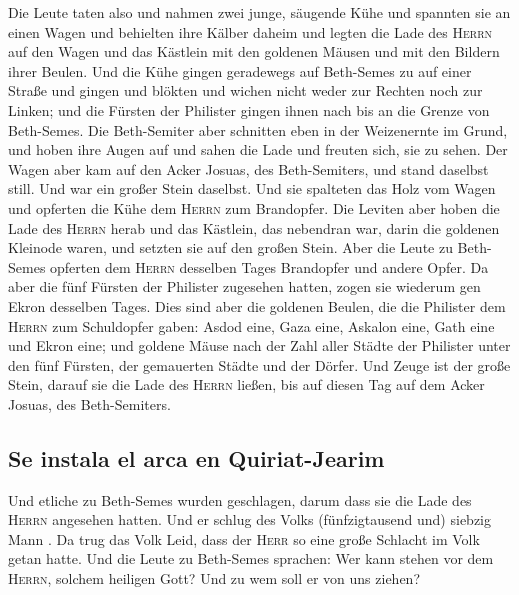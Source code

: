  Die Leute taten also und nahmen zwei junge, säugende
Kühe und spannten sie an einen Wagen und behielten ihre Kälber daheim
 und legten die Lade des \textsc{Herrn} auf den Wagen und
das Kästlein mit den goldenen Mäusen und mit den Bildern ihrer Beulen.
 Und die Kühe gingen geradewegs auf Beth-Semes zu auf
einer Straße und gingen und blökten und wichen nicht weder zur Rechten
noch zur Linken; und die Fürsten der Philister gingen ihnen nach bis an
die Grenze von Beth-Semes.  Die Beth-Semiter aber
schnitten eben in der Weizenernte im Grund, und hoben ihre Augen auf und
sahen die Lade und freuten sich, sie zu sehen.  Der Wagen
aber kam auf den Acker Josuas, des Beth-Semiters, und stand daselbst
still. Und war ein großer Stein daselbst. Und sie spalteten das Holz vom
Wagen und opferten die Kühe dem \textsc{Herrn} zum Brandopfer.
 Die Leviten aber hoben die Lade des \textsc{Herrn} herab
und das Kästlein, das nebendran war, darin die goldenen Kleinode waren,
und setzten sie auf den großen Stein. Aber die Leute zu Beth-Semes
opferten dem \textsc{Herrn} desselben Tages Brandopfer und andere Opfer.
 Da aber die fünf Fürsten der Philister zugesehen hatten,
zogen sie wiederum gen Ekron desselben Tages.  Dies sind
aber die goldenen Beulen, die die Philister dem \textsc{Herrn} zum
Schuldopfer gaben: Asdod eine, Gaza eine, Askalon eine, Gath eine und
Ekron eine;  und goldene Mäuse nach der Zahl aller Städte
der Philister unter den fünf Fürsten, der gemauerten Städte und der
Dörfer. Und Zeuge ist der große Stein, darauf sie die Lade des
\textsc{Herrn} ließen, bis auf diesen Tag auf dem Acker Josuas, des
Beth-Semiters.

\hypertarget{se-instala-el-arca-en-quiriat-jearim}{%
\subsection{Se instala el arca en
Quiriat-Jearim}\label{se-instala-el-arca-en-quiriat-jearim}}

 Und etliche zu Beth-Semes wurden geschlagen, darum dass
sie die Lade des \textsc{Herrn} angesehen hatten. Und er schlug des
Volks (fünfzigtausend und) siebzig Mann . Da trug das Volk Leid, dass
der \textsc{Herr} so eine große Schlacht im Volk getan hatte.
 Und die Leute zu Beth-Semes sprachen: Wer kann stehen
vor dem \textsc{Herrn}, solchem heiligen Gott? Und zu wem soll er von
uns ziehen?

